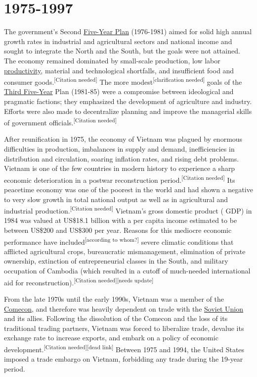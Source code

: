 \documentclass[openany]{book}
\begin{document}
\section{1975-1997}
The government's Second \href{https://en.wikipedia.org/wiki/Five-Year_Plans_of_Vietnam#The_Second_Five-Year_Plan_(1976%E2%80%9380)}{Five-Year Plan} (1976-1981) aimed for solid high annual growth rates in industrial and agricultural sectors and national income and sought to integrate the North and the South, but the goals were not attained. The economy remained dominated by small-scale production, low labor \href{https://en.wikipedia.org/wiki/Productivity}{productivity}, material and technological shortfalls, and insufficient food and consumer goods.\textsuperscript{[Citation needed]} The more modest\textsuperscript{[clarification needed]} goals of the \href{https://en.wikipedia.org/wiki/Five-year_plans_of_Vietnam#The_Third_Five_Year_Plan_(1981%E2%80%9385)}{Third Five-Year} Plan (1981-85) were a compromise between ideological and pragmatic factions; they emphasized the development of agriculture and industry. Efforts were also made to decentralize planning and improve the managerial skills of government officials.\textsuperscript{[Citation needed]}

After reunification in 1975, the economy of Vietnam was plagued by enormous difficulties in production, imbalances in supply and demand, inefficiencies in distribution and circulation, soaring inflation rates, and rising debt problems. Vietnam is one of the few countries in modern history to experience a sharp economic deterioration in a postwar reconstruction period.\textsuperscript{[Citation needed]} Its peacetime economy was one of the poorest in the world and had shown a negative to very slow growth in total national output as well as in agricultural and industrial production.\textsuperscript{[Citation needed]} Vietnam's gross domestic product ( GDP) in 1984 was valued at US\$18.1 billion with a per capita income estimated to be between US\$200 and US\$300 per year. Reasons for this mediocre economic performance have included\textsuperscript{[according to whom?]} severe climatic conditions that afflicted agricultural crops, bureaucratic mismanagement, elimination of private ownership, extinction of entrepreneurial classes in the South, and military occupation of Cambodia (which resulted in a cutoff of much-needed international aid for reconstruction).\textsuperscript{[Citation needed][needs update]}

From the late 1970s until the early 1990s, Vietnam was a member of the \href{https://en.wikipedia.org/wiki/Comecon}{Comecon}, and therefore was heavily dependent on trade with the \href{https://en.wikipedia.org/wiki/Soviet_Union}{Soviet Union} and its allies. Following the dissolution of the Comecon and the loss of its traditional trading partners, Vietnam was forced to liberalize trade, devalue its exchange rate to increase exports, and embark on a policy of economic development.\textsuperscript{[Citation needed][dead link]}  Between 1975 and 1994, the United States imposed a trade embargo on Vietnam, forbidding any trade during the 19-year period.
\end{document}
